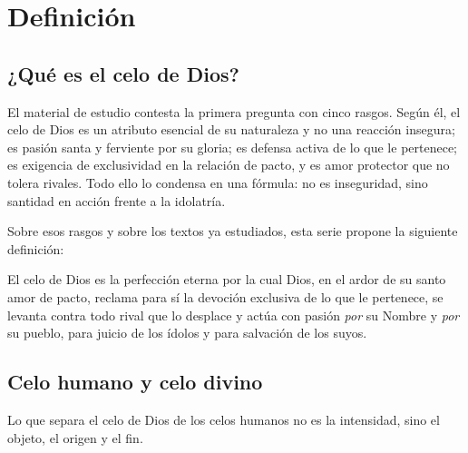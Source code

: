 \section{Definición}

\subsection{¿Qué es el celo de Dios?}
El material de estudio contesta la primera pregunta con cinco rasgos. Según él, el celo de Dios es un atributo esencial de su naturaleza y no una reacción insegura; es pasión santa y ferviente por su gloria; es defensa activa de lo que le pertenece; es exigencia de exclusividad en la relación de pacto, y es amor protector que no tolera rivales. Todo ello lo condensa en una fórmula: no es inseguridad, sino santidad en acción frente a la idolatría.

Sobre esos rasgos y sobre los textos ya estudiados, esta serie propone la siguiente definición:

\begin{tcolorbox}[colback=azul!5!white,colframe=azul,boxrule=1pt,arc=3pt,title={\small Definición},colbacktitle=azul,coltitle=white]
El celo de Dios es la perfección eterna por la cual Dios, en el ardor de su santo amor de pacto, reclama para sí la devoción exclusiva de lo que le pertenece, se levanta contra todo rival que lo desplace y actúa con pasión \emph{por} su Nombre y \emph{por} su pueblo, para juicio de los ídolos y para salvación de los suyos.
\end{tcolorbox}

\subsection{Celo humano y celo divino}
Lo que separa el celo de Dios de los celos humanos no es la intensidad, sino el objeto, el origen y el fin.


